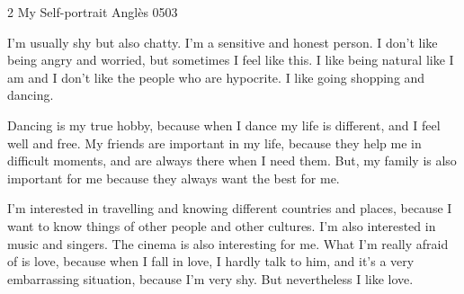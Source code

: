 \begin{news}
{2} %
{My Self-portrait}
{}
{Anglès}
{0503} %

	I'm usually shy but also chatty. I'm a sensitive and honest person. I don't like being angry and worried, but sometimes I feel like this. I like being natural like I am and I don't like the people who are hypocrite. I like going shopping and  dancing.

	Dancing is my true hobby, because when I dance my life is different, and I feel well and free. My friends are important in my life, because they help me in difficult moments, and are always there when I need them. But, my family is also important for me because they always want the best for me.

	I'm interested in travelling and knowing different countries and places, because I want to know things of other people and other cultures. I'm also interested in music and singers. The cinema is also interesting for me.
What I'm really afraid of is love, because when I fall in love, I hardly talk to him, and it's a very embarrassing situation, because I'm very shy. But nevertheless I like love.


\end{news}
